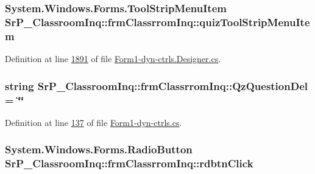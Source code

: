 \hypertarget{class_sr_p___classroom_inq_1_1frm_classrrom_inq_a01bd4f13b978688a925fcace4c5f92bc}{
\subsubsection[{quiz\-Tool\-Strip\-Menu\-Item}]{\setlength{\rightskip}{0pt plus 5cm}\-System.\-Windows.\-Forms.\-Tool\-Strip\-Menu\-Item {\bf \-Sr\-P\-\_\-\-Classroom\-Inq\-::frm\-Classrrom\-Inq\-::quiz\-Tool\-Strip\-Menu\-Item}}}
\label{class_sr_p___classroom_inq_1_1frm_classrrom_inq_a01bd4f13b978688a925fcace4c5f92bc}


\-Definition at line \hyperlink{_form1-dyn-ctrls_8_designer_8cs_source_l01891}{1891} of file \hyperlink{_form1-dyn-ctrls_8_designer_8cs_source}{\-Form1-\/dyn-\/ctrls.\-Designer.\-cs}.

\hypertarget{class_sr_p___classroom_inq_1_1frm_classrrom_inq_a1fe88369748706492ccc7292a0e47331}{
\subsubsection[{\-Qz\-Question\-Del}]{\setlength{\rightskip}{0pt plus 5cm}string {\bf \-Sr\-P\-\_\-\-Classroom\-Inq\-::frm\-Classrrom\-Inq\-::\-Qz\-Question\-Del} = \char`\"{}\char`\"{}}}
\label{class_sr_p___classroom_inq_1_1frm_classrrom_inq_a1fe88369748706492ccc7292a0e47331}


\-Definition at line \hyperlink{_form1-dyn-ctrls_8cs_source_l00137}{137} of file \hyperlink{_form1-dyn-ctrls_8cs_source}{\-Form1-\/dyn-\/ctrls.\-cs}.

\hypertarget{class_sr_p___classroom_inq_1_1frm_classrrom_inq_a116a0f948fdc7187ae7dc028026eec59}{
\subsubsection[{rdbtn\-Click}]{\setlength{\rightskip}{0pt plus 5cm}\-System.\-Windows.\-Forms.\-Radio\-Button {\bf \-Sr\-P\-\_\-\-Classroom\-Inq\-::frm\-Classrrom\-Inq\-::rdbtn\-Click}}}
\label{class_sr_p___classroom_inq_1_1frm_classrrom_inq_a116a0f948fdc7187ae7dc028026eec59}


